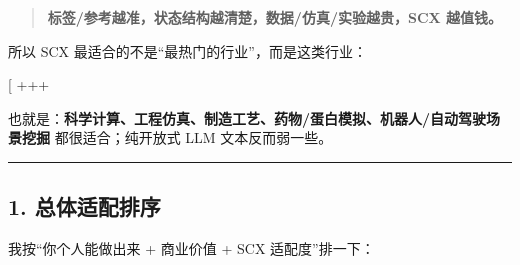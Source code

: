 \documentclass[
  12pt,
]{ctexart}
\begin{document}
\begin{quote}
\textbf{标签/参考越准，状态结构越清楚，数据/仿真/实验越贵，SCX 越值钱。}
\end{quote}

所以 SCX 最适合的不是``最热门的行业''，而是这类行业：

{[}
+++\text{可验证结果}{]}

也就是：\textbf{科学计算、工程仿真、制造工艺、药物/蛋白模拟、机器人/自动驾驶场景挖掘}
都很适合；纯开放式 LLM 文本反而弱一些。

\begin{center}\rule{0.5\linewidth}{0.5pt}\end{center}

\subsection{1. 总体适配排序}\label{ux603bux4f53ux9002ux914dux6392ux5e8f}

我按``你个人能做出来 + 商业价值 + SCX 适配度''排一下：
\end{document}
